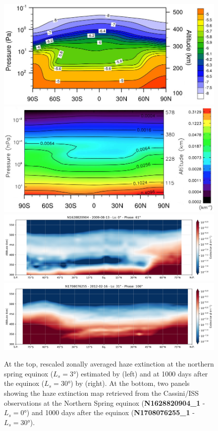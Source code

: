 \begin{figure}[!ht]
    \centering
    \includegraphics[width=.4\textwidth]{Fig/Lebonnois2012_Fig4_equinox.jpg}
    \includegraphics[width=.4\textwidth]{Fig/Larson2015-Fig7_Spring.jpg}
    \includegraphics[width=.8\textwidth]{Fig/N1628820904_1-lat_beta.png}
    \includegraphics[width=.8\textwidth]{Fig/N1708076255_1-lat_beta.png}
    \caption{At the top, rescaled zonally averaged haze extinction at the northern spring equinox ($L_s = \ang{3}$)
        estimated by \cite{Lebonnois2012} (left) and at 1000 days after the equinox ($L_s = \ang{30}$)
        by \cite{Larson2015} (right).
        At the bottom, two panels showing the haze extinction map retrieved from the Cassini/ISS observations
        at the Northern Spring equinox (\textbf{N1628820904\_1} - $L_s = \ang{0}$) and 1000 days after the equinox
        (\textbf{N1708076255\_1} - $L_s = \ang{30}$).}
    \label{fig:gcm_spring}
\end{figure}

